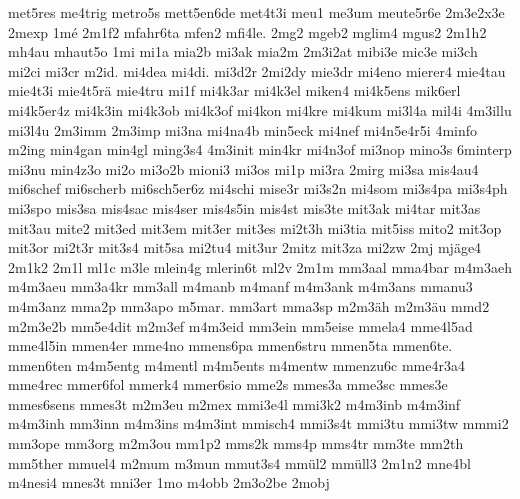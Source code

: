 {    met5res
    me4trig
    metro5s
    mett5en6de
    met4t3i
    meu1
    me3um
    meute5r6e
    2m3e2x3e
    2mexp
    1mé
    2m1f2
    mfahr6ta
    mfen2
    mfi4le.
    2mg2
    mgeb2
    mglim4
    mgus2
    2m1h2
    mh4au
    mhaut5o
    1mi
    mi1a
    mia2b
    mi3ak
    mia2m
    2m3i2at
    mibi3e
    mic3e
    mi3ch
    mi2ci
    mi3cr
    m2id.
    mi4dea
    mi4di.
    mi3d2r
    2mi2dy
    mie3dr
    mi4eno
    mierer4
    mie4tau
    mie4t3i
    mie4t5rä
    mie4tru
    mi1f
    mi4k3ar
    mi4k3el
    miken4
    mi4k5ens
    mik6erl
    mi4k5er4z
    mi4k3in
    mi4k3ob
    mi4k3of
    mi4kon
    mi4kre
    mi4kum
    mi3l4a
    mil4i
    4m3illu
    mi3l4u
    2m3imm
    2m3imp
    mi3na
    mi4na4b
    min5eck
    mi4nef
    mi4n5e4r5i
    4minfo
    m2ing
    min4gan
    min4gl
    ming3s4
    4m3init
    min4kr
    mi4n3of
    mi3nop
    mino3s
    6minterp
    mi3nu
    min4z3o
    mi2o
    mi3o2b
    mioni3
    mi3os
    mi1p
    mi3ra
    2mirg
    mi3sa
    mis4au4
    mi6schef
    mi6scherb
    mi6sch5er6z
    mi4schi
    mise3r
    mi3s2n
    mi4som
    mi3s4pa
    mi3s4ph
    mi3spo
    mis3sa
    mis4sac
    mis4ser
    mis4s5in
    mis4st
    mis3te
    mit3ak
    mi4tar
    mit3as
    mit3au
    mite2
    mit3ed
    mit3em
    mit3er
    mit3es
    mi2t3h
    mi3tia
    mit5iss
    mito2
    mit3op
    mit3or
    mi2t3r
    mit3s4
    mit5sa
    mi2tu4
    mit3ur
    2mitz
    mit3za
    mi2zw
    2mj
    mjäge4
    2m1k2
    2m1l
    ml1c
    m3le
    mlein4g
    mlerin6t
    ml2v
    2m1m
    mm3aal
    mma4bar
    m4m3aeh
    m4m3aeu
    mm3a4kr
    mm3all
    m4manb
    m4manf
    m4m3ank
    m4m3ans
    mmanu3
    m4m3anz
    mma2p
    mm3apo
    m5mar.
    mm3art
    mma3sp
    m2m3äh
    m2m3äu
    mmd2
    m2m3e2b
    mm5e4dit
    m2m3ef
    m4m3eid
    mm3ein
    mm5eise
    mmela4
    mme4l5ad
    mme4l5in
    mmen4er
    mme4no
    mmens6pa
    mmen6stru
    mmen5ta
    mmen6te.
    mmen6ten
    m4m5entg
    m4mentl
    m4m5ents
    m4mentw
    mmenzu6c
    mme4r3a4
    mme4rec
    mmer6fol
    mmerk4
    mmer6sio
    mme2s
    mmes3a
    mme3sc
    mmes3e
    mmes6sens
    mmes3t
    m2m3eu
    m2mex
    mmi3e4l
    mmi3k2
    m4m3inb
    m4m3inf
    m4m3inh
    mm3inn
    m4m3ins
    m4m3int
    mmisch4
    mmi3s4t
    mmi3tu
    mmi3tw
    mmmi2
    mm3ope
    mm3org
    m2m3ou
    mm1p2
    mms2k
    mms4p
    mms4tr
    mm3te
    mm2th
    mm5ther
    mmuel4
    m2mum
    m3mun
    mmut3s4
    mmül2
    mmüll3
    2m1n2
    mne4bl
    m4nesi4
    mnes3t
    mni3er
    1mo
    m4obb
    2m3o2be
    2mobj
}
